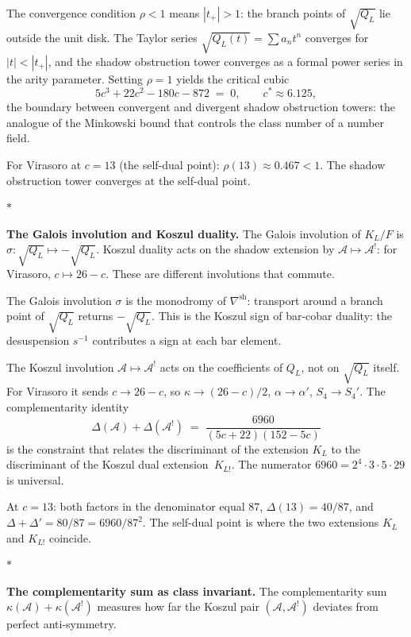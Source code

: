 \documentclass[11pt]{article}
\newcommand{\cA}{\mathcal{A}}
\newcommand{\sep}{\bigskip\begin{center}$*$\end{center}\medskip}
\begin{document}
The convergence condition $\rho < 1$ means $|t_+| > 1$: the
branch points of $\sqrt{Q_L}$ lie outside the unit disk.  The
Taylor series $\sqrt{Q_L(t)} = \sum a_n t^n$ converges for
$|t| < |t_+|$, and the shadow obstruction tower converges as a formal power
series in the arity parameter.  Setting $\rho = 1$ yields the
critical cubic
\[
  5c^3 + 22c^2 - 180c - 872 \;=\; 0,
  \qquad c^* \approx 6.125,
\]
the boundary between convergent and divergent shadow obstruction towers:
the analogue of the Minkowski bound that controls the class
number of a number field.

For Virasoro at $c = 13$ (the self-dual point):
$\rho(13) \approx 0.467 < 1$.  The shadow obstruction tower converges
at the self-dual point.

\sep

\noindent\textbf{The Galois involution and Koszul duality.}\enspace
The Galois involution of $K_L/F$ is
$\sigma\colon \sqrt{Q_L} \mapsto -\sqrt{Q_L}$.
Koszul duality acts on the shadow extension by
$\cA \mapsto \cA^!$: for Virasoro, $c \mapsto 26 - c$.
These are different involutions that commute.

The Galois involution $\sigma$ is the monodromy of
$\nabla^{\mathrm{sh}}$: transport around a branch point
of $\sqrt{Q_L}$ returns $-\sqrt{Q_L}$.  This is the
Koszul sign of bar-cobar duality: the desuspension
$s^{-1}$ contributes a sign at each bar element.

The Koszul involution $\cA \mapsto \cA^!$ acts on the
coefficients of $Q_L$, not on $\sqrt{Q_L}$ itself.  For
Virasoro it sends $c \to 26 - c$, so
$\kappa \to (26-c)/2$, $\alpha \to \alpha'$,
$S_4 \to S_4'$.  The complementarity identity
\begin{equation}\label{eq:disc-complementarity-wn}
  \Delta(\cA) + \Delta(\cA^!)
  \;=\;
  \frac{6960}{(5c{+}22)(152{-}5c)}
\end{equation}
is the constraint that relates the discriminant of the
extension $K_L$ to the discriminant of the Koszul dual
extension~$K_{L!}$.  The numerator $6960 = 2^4 \cdot 3
\cdot 5 \cdot 29$ is universal.

At $c = 13$: both factors in the denominator equal $87$,
$\Delta(13) = 40/87$, and $\Delta + \Delta'
= 80/87 = 6960/87^2$.  The self-dual point is where the
two extensions $K_L$ and $K_{L!}$ coincide.

\sep

\noindent\textbf{The complementarity sum as class invariant.}\enspace
The complementarity sum
$\kappa(\cA) + \kappa(\cA^!)$ measures how far the Koszul
pair $(\cA, \cA^!)$ deviates from perfect anti-symmetry.
\end{document}
